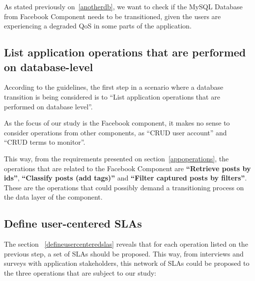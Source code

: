 As stated previously on~\ref{anotherdb}, we want to check if the MySQL Database from Facebook Component needs to be transitioned, given the users are experiencing a degraded QoS in some parts of the application. 

\subsection{List application operations that are performed on database-level}
According to the guidelines, the first step in a scenario where a database transition is being considered is to ``List application operations that are performed on database level''. 

As the focus of our study is the Facebook component, it makes no sense to consider operations from other components, as ``CRUD user account'' and ``CRUD terms to monitor''. 

This way, from the requirements presented on section~\ref{appoperations}, the operations that are related to the Facebook Component are \textbf{``Retrieve posts by ids''}, \textbf{``Classify posts (add tags)''} and \textbf{``Filter captured posts by filters''}. These are the operations that could possibly demand a transitioning process on the data layer of the component.  


\subsection{Define user-centered SLAs}

The section ~\ref{defineusercenteredslas} reveals that for each operation listed on the previous step, a set of SLAs should be proposed. This way, from interviews and surveys with application stakeholders, this network of SLAs could be proposed to the three operations that are subject to our study: 

